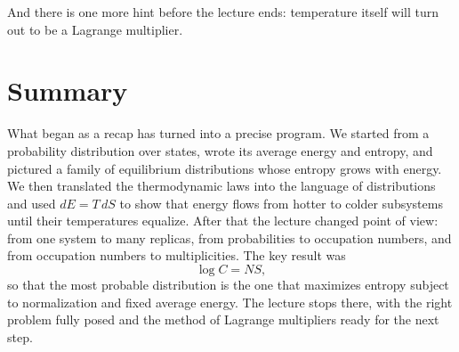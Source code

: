 And there is one more hint before the lecture ends: temperature itself will turn out to be a Lagrange multiplier.

\section{Summary}

What began as a recap has turned into a precise program. We started from a probability distribution over states, wrote its average energy and entropy, and pictured a family of equilibrium distributions whose entropy grows with energy. We then translated the thermodynamic laws into the language of distributions and used \(dE=T\,dS\) to show that energy flows from hotter to colder subsystems until their temperatures equalize. After that the lecture changed point of view: from one system to many replicas, from probabilities to occupation numbers, and from occupation numbers to multiplicities. The key result was
\begin{equation}
\log C = NS,
\end{equation}
so that the most probable distribution is the one that maximizes entropy subject to normalization and fixed average energy. The lecture stops there, with the right problem fully posed and the method of Lagrange multipliers ready for the next step.